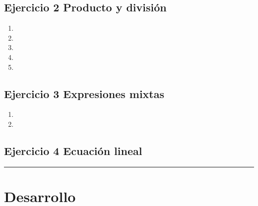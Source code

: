 \documentclass[11pt,fleqn]{article}
\begin{document}
\subsection*{Ejercicio 2 Producto y división}
\begin{enumerate}[label=\alph*)]
\item {}
\item {}
\item {}
\item {}
\item {}
\end{enumerate}

\subsection*{Ejercicio 3 Expresiones mixtas}
\begin{enumerate}[label=\alph*)]
\item {}
\item {}
\end{enumerate}

\subsection*{Ejercicio 4 Ecuación lineal}

\vspace{1em}
\hrule
\vspace{1em}


\section*{Desarrollo}
\end{document}
